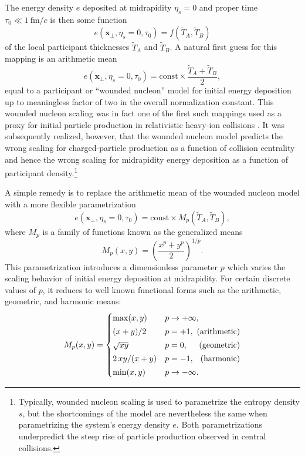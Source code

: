 \documentclass[aps,prc,reprint,amsmath,nofootinbib]{revtex4-1}
\newcommand{\fmc}{\ensuremath{\text{fm}/c}}
\newcommand{\T}{\tilde{T}}
\newcommand{\xv}{\mathbf x}
\begin{document}
The energy density $e$ deposited at midrapidity $\eta_s=0$ and proper time $\tau_0 \ll 1~\fmc$ is then some function
\begin{equation}
  e(\xv_\perp, \eta_s=0, \tau_0) = f(\T_A, \T_B)
\end{equation}
of the local participant thicknesses $\T_A$ and $\T_B$.
A natural first guess for this mapping is an arithmetic mean
\begin{equation}
  e(\xv_\perp, \eta_s=0, \tau_0) = \text{const} \times \frac{\T_A + \T_B}{2},
\end{equation}
equal to a participant or ``wounded nucleon'' model for initial energy deposition up to meaningless factor of two in the overall normalization constant.
This wounded nucleon scaling was in fact one of the first such mappings used as a proxy for initial particle production in relativistic heavy-ion collisions \cite{Bialas:1976ed}.
It was subsequently realized, however, that the wounded nucleon model predicts the wrong scaling for charged-particle production as a function of collision centrality \cite{Kharzeev:2000ph} and hence the wrong scaling for midrapidity energy deposition
as a function of participant density.\footnote{Typically, wounded nucleon scaling is used to parametrize the entropy density $s$, but the shortcomings of the model are nevertheless the same when parametrizing the system's energy density $e$. Both parametrizations underpredict the steep rise of particle production observed in central collisions.}

A simple remedy is to replace the arithmetic mean of the wounded nucleon model with a more flexible parametrization
\begin{equation}
  \label{eq:gmean}
  e(\xv_\perp, \eta_s=0, \tau_0) = \text{const} \times M_p(\T_A, \T_B),
\end{equation}
where $M_p$ is a family of functions known as the generalized means
\begin{equation}
  M_p(x, y) = \left( \frac{x^p + y^p}{2} \right)^{1/p}.
\end{equation}
This parametrization introduces a dimensionless parameter $p$ which varies the scaling behavior of initial energy deposition at midrapidity.
For certain discrete values of $p$, it reduces to well known functional forms such as the arithmetic, geometric, and harmonic means:
\begin{equation}
  \newlength{\extraspace}
  \setlength{\extraspace}{0.5ex}
  M_p(x, y) =
  \begin{cases}
    \max(x, y) & p \rightarrow +\infty, \\[\extraspace]
    (x + y)/2 & p = +1, \hfill \text{ (arithmetic)} \\[\extraspace]
    \sqrt{x y} & p = 0, \hfill \text{ (geometric)} \\[\extraspace]
    2\, x y/(x + y) & p = -1, \hfill \text{ (harmonic)} \\[\extraspace]
    \min(x, y) & p \rightarrow -\infty.
  \end{cases}
  \label{eq:trento_p}
\end{equation}
\end{document}
